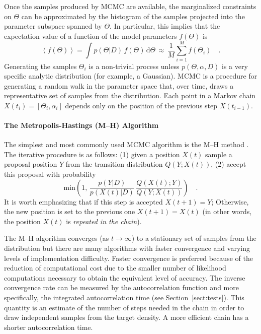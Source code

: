 \documentclass[12pt,preprint]{aastex}
\newcommand{\Sect}[1]{Section~\ref{sect:#1}}
\newcommand{\sect}[1]{\Sect{#1}}
\newcommand{\Algo}[1]{Algorithm~\ref{algo:#1}}
\newcommand{\algo}[1]{\Algo{#1}}
\newcommand{\dd}{\mathrm{d}}
\renewcommand{\vector}[1]{#1}
\newcommand{\pr}[1]{\ensuremath{p(#1)}}
\newcommand{\expect}[1]{\left<#1\right>}
\newcommand{\model}{\ensuremath{\vector{\Theta}}}
\newcommand{\data}{\ensuremath{\vector{D}}}
\newcommand{\nuisance}{\ensuremath{\vector{\alpha}}}
\newcommand{\link}{\ensuremath{X}}
\begin{document}
Once the samples
produced by MCMC are available, the marginalized constraints on $\model$
can be approximated by
the histogram of the samples projected into the parameter subspace spanned
by $\model$. In particular, this implies that the
expectation value of a function of the model parameters $f(\model)$ is
\begin{equation}
    \expect{f(\model)} = \int
    \pr{\model|\data}
    \, f(\model) \, \dd\model
    \,\approx\, \frac{1}{M} \sum_{i=1} ^M f(\model_i) \quad.
\end{equation}
Generating the samples $\model_i$ is a non-trivial process unless
$\pr{\model, \nuisance, \data}$ is a very specific analytic distribution
(for example, a Gaussian). MCMC is a procedure for generating a random walk
in the parameter space that, over time, draws a representative set
of samples from the distribution. Each point in a Markov chain
$\link (t_i) = [\model_i, \nuisance_i]$
depends only on the position of the previous step $\link (t_{i-1})$.

\paragraph{The Metropolis-Hastings (M--H) Algorithm}

The simplest and most commonly used MCMC algorithm is the M--H method
\citep[\algo{mh};][]{MacKay:2003,Gregory:2005,Press:2007,Hogg:2010}.
The iterative procedure is as follows: (1) given a position
$X(t)$ sample a proposal position $Y$ from the transition distribution
$Q(Y; X(t))$, (2) accept this proposal with probability
\begin{equation}
    \mathrm{min} \left( 1,\,
            \frac{\pr{\vector{Y} | \data}}{\pr{\vector{X}(t) | \data}} \,
            \frac{Q(X(t); Y)}{ Q(Y;X(t))}  \right) \quad.
\end{equation}
It is worth emphasizing that if this step is accepted $X(t+1) = Y$; Otherwise,
the new position is set to the previous one $X(t+1) = X(t)$ (in other
words, the position $X(t)$ is \emph{repeated in the chain}).

The M--H algorithm converges (as $t \to \infty$) to a stationary set of
samples from the distribution but there are many algorithms with faster
convergence and varying levels of implementation difficulty.
Faster convergence is preferred because of the reduction of computational
cost due to the smaller number of likelihood computations necessary to obtain
the equivalent level of accuracy. The inverse convergence rate can be
measured by the autocorrelation function and more specifically, the integrated
autocorrelation time (see \sect{tests}). This quantity is an estimate of the
number of steps needed in the chain in order to draw independent samples from
the target density. A more efficient chain has a shorter
autocorrelation time.
\end{document}
